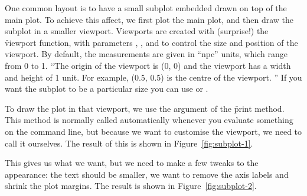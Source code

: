One common layout is to have a small subplot embedded drawn on top of the main plot.  To achieve this affect, we first plot the main plot, and then draw the subplot in a smaller viewport.  Viewports are created with (surprise!) the \f{viewport} function, with parameters , ,  and  to control the size and position of the viewport.  By default, the measurements are given in ``npc'' units, which range from 0 to 1. ``The origin of the viewport is (0, 0) and the viewport has a width and height of 1 unit. For example, (0.5, 0.5) is the centre of the viewport. '' If you want the subplot to be a particular size you can use  or .

To draw the plot in that viewport, we use the  argument of the \f{print} method.  This method is normally called automatically whenever you evaluate something on the command line, but because we want to customise the viewport, we need to call it ourselves.  The result of this is shown in Figure~\ref{fig:subplot-1}.

% 

This gives us what we want, but we need to make a few tweaks to the appearance: the text should be smaller, we want to remove the axis labels and shrink the plot margins.  The result is shown in Figure~\ref{fig:subplot-2}.

% 
% 

